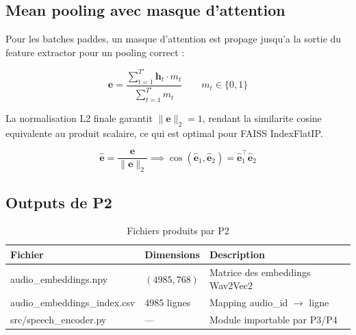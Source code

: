 \documentclass[12pt, a4paper]{article}
\begin{document}
\subsection{Mean pooling avec masque d'attention}

Pour les batches paddes, un masque d'attention est propage jusqu'a la sortie
du feature extractor pour un pooling correct :

\begin{equation}
  \mathbf{e} = \frac{\sum_{t=1}^{T'} \mathbf{h}_t \cdot m_t}{\sum_{t=1}^{T'} m_t}
  \qquad m_t \in \{0, 1\}
\end{equation}

La normalisation L2 finale garantit $\|\mathbf{e}\|_2 = 1$, rendant la similarite
cosine equivalente au produit scalaire, ce qui est optimal pour FAISS IndexFlatIP.

\begin{equation}
  \hat{\mathbf{e}} = \frac{\mathbf{e}}{\|\mathbf{e}\|_2}
  \implies \cos(\hat{\mathbf{e}}_1, \hat{\mathbf{e}}_2) = \hat{\mathbf{e}}_1^\top \hat{\mathbf{e}}_2
\end{equation}

\subsection{Outputs de P2}

\begin{table}[H]
\centering
\caption{Fichiers produits par P2}
\begin{tabularx}{\linewidth}{>{\ttfamily}l l X}
\toprule
\textbf{Fichier} & \textbf{Dimensions} & \textbf{Description} \\
\midrule
audio\_embeddings.npy        & $(4985, 768)$ & Matrice des embeddings Wav2Vec2 \\
\rowcolor{silver}
audio\_embeddings\_index.csv  & 4985 lignes  & Mapping audio\_id $\rightarrow$ ligne \\
src/speech\_encoder.py        & ---          & Module importable par P3/P4 \\
\bottomrule
\end{tabularx}
\end{table}

\newpage

\end{document}
